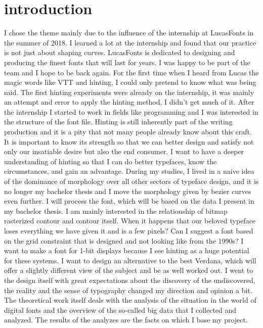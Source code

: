 \documentclass[a4paper]{article}
\begin{document}
\section{introduction}
\setcounter{page}{1}
I chose the theme mainly due to the influence of the internship at LucasFonts in the summer of 2018. I learned a lot at the internship and found that our practice is not just about shaping curves. LucasFonts is dedicated to designing and producing the finest fonts that will last for years. I was happy to be part of the team and I hope to be back again. For the first time when I heard from Lucas the magic words like VTT and hinting, I could only pretend to know what was being said. The first hinting experiments were already on the internship, it was mainly an attempt and error to apply the hinting method, I didn't get much of it. After the internship I started to work in fields like programming and I was interested in the structure of the font file. Hinting is still inherently part of the writing production and it is a pity that not many people already know about this craft. It is important to know its strength so that we can better design and satisfy not only our insatiable desire but also the end consumer. I want to have a deeper understanding of hinting so that I can do better typefaces, know the circumstances, and gain an advantage. During my studies, I lived in a naive idea of  the dominance of morphology over all other sectors of typeface design, and it is no longer my bachelor thesis and I move the morphology given by bezier curves even further. I will process the font, which will be based on the data I present in my bachelor thesis. I am mainly interested in the relationship of bitmap rasterized contour and contour itself. When it happens that our beloved typeface loses everything we have given it and is a few pixels? Can I suggest a font based on the grid constraint that is designed and not looking like from the 1990s? I want to make a font for 1-bit displays because I see hinting as a huge potential for these systems. I want to design an alternative to the best Verdana, which will offer a slightly different view of the subject and be as well worked out. I went to the design itself with great expectations about the discovery of the undiscovered, the reality and the sense of typography changed my direction and opinion a bit. The theoretical work itself deals with the analysis of the situation in the world of digital fonts and the overview of the so-called big data that I collected and analyzed. The results of the analyzes are the facts on which I base my project.
\end{document}
